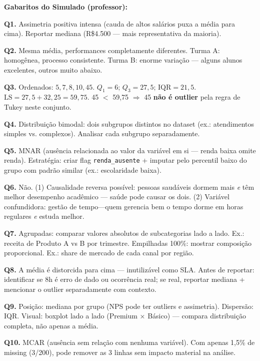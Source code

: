\begin{SolvedBox}
\textbf{Gabaritos do Simulado (professor):}

\textbf{Q1.} Assimetria positiva intensa (cauda de altos salários puxa a média para cima).
Reportar mediana (R\$4.500 — mais representativa da maioria).

\textbf{Q2.} Mesma média, performances completamente diferentes. Turma A: homogênea,
processo consistente. Turma B: enorme variação — alguns alunos excelentes, outros muito abaixo.

\textbf{Q3.} Ordenados: $5,7,8,10,45$. $Q_1=6$; $Q_3=27{,}5$; $\text{IQR}=21{,}5$.
$\text{LS} = 27{,}5 + 32{,}25 = 59{,}75$. 45 $<$ 59,75 $\Rightarrow$ 45 \textbf{não é outlier} pela regra de Tukey neste conjunto.

\textbf{Q4.} Distribuição bimodal: dois subgrupos distintos no dataset (ex.: atendimentos
simples vs. complexos). Analisar cada subgrupo separadamente.

\textbf{Q5.} MNAR (ausência relacionada ao valor da variável em si — renda baixa omite renda).
Estratégia: criar flag \texttt{renda\_ausente} + imputar pelo percentil baixo do grupo com
padrão similar (ex.: escolaridade baixa).

\textbf{Q6.} Não. (1) Causalidade reversa possível: pessoas saudáveis dormem mais
\emph{e} têm melhor desempenho acadêmico — saúde pode causar os dois. (2) Variável
confundidora: gestão de tempo—quem gerencia bem o tempo dorme em horas regulares
\emph{e} estuda melhor.

\textbf{Q7.} Agrupadas: comparar valores absolutos de subcategorias lado a lado.
Ex.: receita de Produto A vs B por trimestre. Empilhadas 100\%: mostrar composição
proporcional. Ex.: share de mercado de cada canal por região.

\textbf{Q8.} A média é distorcida para cima — inutilizável como SLA. Antes de reportar:
identificar se 8h é erro de dado ou ocorrência real; se real, reportar mediana + mencionar
o outlier separadamente com contexto.

\textbf{Q9.} Posição: mediana por grupo (NPS pode ter outliers e assimetria).
Dispersão: IQR. Visual: boxplot lado a lado (Premium × Básico) — compara
distribuição completa, não apenas a média.

\textbf{Q10.} MCAR (ausência sem relação com nenhuma variável). Com apenas 1,5\% de
missing (3/200), pode remover as 3 linhas sem impacto material na análise.
\end{SolvedBox}

